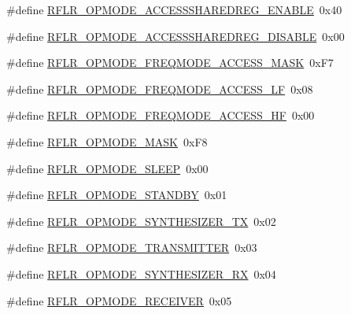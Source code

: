 \begin{DoxyCompactItemize}
\item 
\#define \mbox{\hyperlink{sx1276_regs-_lo_ra_8h_a32305e7842ed6a5e27dea62504bb59da}{R\+F\+L\+R\+\_\+\+O\+P\+M\+O\+D\+E\+\_\+\+A\+C\+C\+E\+S\+S\+S\+H\+A\+R\+E\+D\+R\+E\+G\+\_\+\+E\+N\+A\+B\+LE}}~0x40
\item 
\#define \mbox{\hyperlink{sx1276_regs-_lo_ra_8h_ad9b5fa39ecfbad14292001a38b5db44d}{R\+F\+L\+R\+\_\+\+O\+P\+M\+O\+D\+E\+\_\+\+A\+C\+C\+E\+S\+S\+S\+H\+A\+R\+E\+D\+R\+E\+G\+\_\+\+D\+I\+S\+A\+B\+LE}}~0x00
\item 
\#define \mbox{\hyperlink{sx1276_regs-_lo_ra_8h_af78146c81e7e2c1d15a3c1f487fc8237}{R\+F\+L\+R\+\_\+\+O\+P\+M\+O\+D\+E\+\_\+\+F\+R\+E\+Q\+M\+O\+D\+E\+\_\+\+A\+C\+C\+E\+S\+S\+\_\+\+M\+A\+SK}}~0x\+F7
\item 
\#define \mbox{\hyperlink{sx1276_regs-_lo_ra_8h_ac3b485df85439dc57b6ff9fa4b4e7178}{R\+F\+L\+R\+\_\+\+O\+P\+M\+O\+D\+E\+\_\+\+F\+R\+E\+Q\+M\+O\+D\+E\+\_\+\+A\+C\+C\+E\+S\+S\+\_\+\+LF}}~0x08
\item 
\#define \mbox{\hyperlink{sx1276_regs-_lo_ra_8h_aa8585403cacfc764a79455a2e82507bf}{R\+F\+L\+R\+\_\+\+O\+P\+M\+O\+D\+E\+\_\+\+F\+R\+E\+Q\+M\+O\+D\+E\+\_\+\+A\+C\+C\+E\+S\+S\+\_\+\+HF}}~0x00
\item 
\#define \mbox{\hyperlink{sx1276_regs-_lo_ra_8h_ae81262dc31f1b6843d2d09125dda0659}{R\+F\+L\+R\+\_\+\+O\+P\+M\+O\+D\+E\+\_\+\+M\+A\+SK}}~0x\+F8
\item 
\#define \mbox{\hyperlink{sx1276_regs-_lo_ra_8h_a042c25d6f974d449c3ba24782751cd45}{R\+F\+L\+R\+\_\+\+O\+P\+M\+O\+D\+E\+\_\+\+S\+L\+E\+EP}}~0x00
\item 
\#define \mbox{\hyperlink{sx1276_regs-_lo_ra_8h_afb7498d406642d2e07cb383010697c0a}{R\+F\+L\+R\+\_\+\+O\+P\+M\+O\+D\+E\+\_\+\+S\+T\+A\+N\+D\+BY}}~0x01
\item 
\#define \mbox{\hyperlink{sx1276_regs-_lo_ra_8h_ab5c2916d7198480084d9275020ed67f0}{R\+F\+L\+R\+\_\+\+O\+P\+M\+O\+D\+E\+\_\+\+S\+Y\+N\+T\+H\+E\+S\+I\+Z\+E\+R\+\_\+\+TX}}~0x02
\item 
\#define \mbox{\hyperlink{sx1276_regs-_lo_ra_8h_a2ccdd26a6b1283c6f8f0710b49269d02}{R\+F\+L\+R\+\_\+\+O\+P\+M\+O\+D\+E\+\_\+\+T\+R\+A\+N\+S\+M\+I\+T\+T\+ER}}~0x03
\item 
\#define \mbox{\hyperlink{sx1276_regs-_lo_ra_8h_a51b6a8bcd4bb5e0016428956ffa91794}{R\+F\+L\+R\+\_\+\+O\+P\+M\+O\+D\+E\+\_\+\+S\+Y\+N\+T\+H\+E\+S\+I\+Z\+E\+R\+\_\+\+RX}}~0x04
\item 
\#define \mbox{\hyperlink{sx1276_regs-_lo_ra_8h_a18ffa4e2930797bbeb71fd15ae77dfe0}{R\+F\+L\+R\+\_\+\+O\+P\+M\+O\+D\+E\+\_\+\+R\+E\+C\+E\+I\+V\+ER}}~0x05

\end{DoxyCompactItemize}
